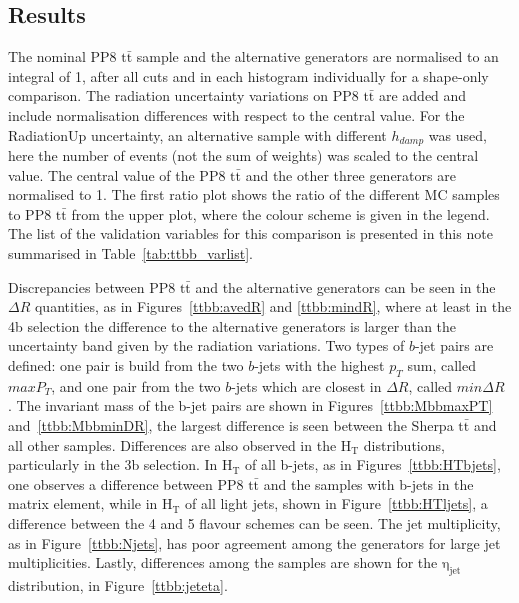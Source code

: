 \subsection{Results}
The nominal PP8 $\mathrm{t\bar{t}}$ sample and the alternative generators are normalised to an integral of 1, after all cuts and in each histogram individually for a shape-only comparison.
The radiation uncertainty variations on PP8 $\mathrm{t\bar{t}}$ are added and include normalisation differences with respect to the central value. For the RadiationUp uncertainty, an alternative sample with different $h_{damp}$ was used, here the number of events (not the sum of weights) was scaled to the central value.
The central value of the PP8 $\mathrm{t\bar{t}}$ and the other three generators are normalised to 1. The first ratio plot shows the ratio of the different MC samples to PP8 $\mathrm{t\bar{t}}$ from the upper plot, where the colour scheme is given in the legend.
The list of the validation variables for this comparison is presented in this note summarised in Table~\ref{tab:ttbb_varlist}.

Discrepancies between PP8 $\mathrm{t\bar{t}}$ and the alternative generators can be seen in the $\Delta R$ quantities, as in Figures~\ref{ttbb:avedR} and \ref{ttbb:mindR}, where at least in the 4b selection the difference to the alternative generators is larger than the uncertainty band given by the radiation variations.  
Two types of $b$-jet pairs are defined: one pair is build from the two $b$-jets with the highest $p_T$ sum, called $maxP_T$, and one pair from the two $b$-jets which are closest in $\Delta R$, called $min \Delta R$ . The invariant mass of the b-jet pairs are shown in Figures~\ref{ttbb:MbbmaxPT} and~\ref{ttbb:MbbminDR}, the largest difference is seen between the Sherpa $\mathrm{t\bar{t}}$ and all other samples.
%
Differences are also observed in the $\mathrm{H_T}$ distributions, particularly in the 3b selection. In $\mathrm{H_T}$ of all b-jets, as in Figures~\ref{ttbb:HTbjets}, one observes a difference between PP8 $\mathrm{t\bar{t}}$ and the samples with b-jets in the matrix element, while in $\mathrm{H_T}$ of all light jets, shown in Figure~\ref{ttbb:HTljets}, a difference between the 4 and 5 flavour schemes can be seen. The jet multiplicity, as in Figure~\ref{ttbb:Njets}, has poor agreement among the generators for large jet multiplicities.
Lastly, differences among the samples are shown for the $\mathrm{\eta_{jet}}$ distribution, in Figure~\ref{ttbb:jeteta}.

